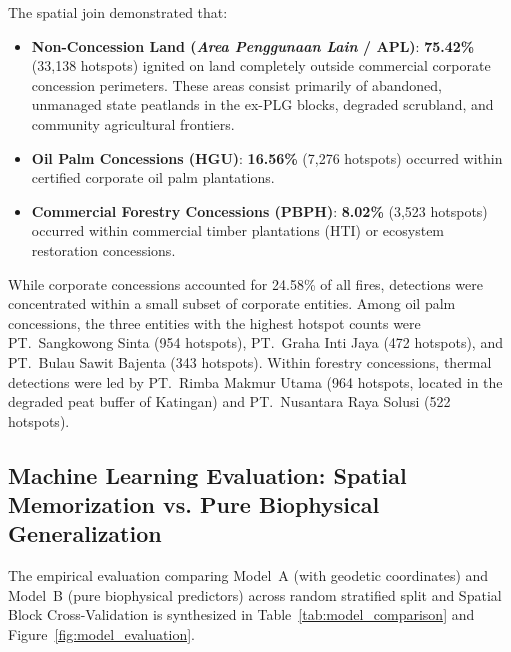 The spatial join demonstrated that:
\begin{itemize}
    \item \textbf{Non-Concession Land (\textit{Area Penggunaan Lain} / APL)}: \textbf{75.42\%} (33,138 hotspots) ignited on land completely outside commercial corporate concession perimeters. These areas consist primarily of abandoned, unmanaged state peatlands in the ex-PLG blocks, degraded scrubland, and community agricultural frontiers.
    \item \textbf{Oil Palm Concessions (HGU)}: \textbf{16.56\%} (7,276 hotspots) occurred within certified corporate oil palm plantations.
    \item \textbf{Commercial Forestry Concessions (PBPH)}: \textbf{8.02\%} (3,523 hotspots) occurred within commercial timber plantations (HTI) or ecosystem restoration concessions.
\end{itemize}

While corporate concessions accounted for 24.58\% of all fires, detections were concentrated within a small subset of corporate entities. Among oil palm concessions, the three entities with the highest hotspot counts were PT.~Sangkowong Sinta (954 hotspots), PT.~Graha Inti Jaya (472 hotspots), and PT.~Bulau Sawit Bajenta (343 hotspots). Within forestry concessions, thermal detections were led by PT.~Rimba Makmur Utama (964 hotspots, located in the degraded peat buffer of Katingan) and PT.~Nusantara Raya Solusi (522 hotspots).

\subsection{Machine Learning Evaluation: Spatial Memorization vs. Pure Biophysical Generalization}
\label{subsec:results_ml}

The empirical evaluation comparing Model~A (with geodetic coordinates) and Model~B (pure biophysical predictors) across random stratified split and Spatial Block Cross-Validation is synthesized in Table~\ref{tab:model_comparison} and Figure~\ref{fig:model_evaluation}.

